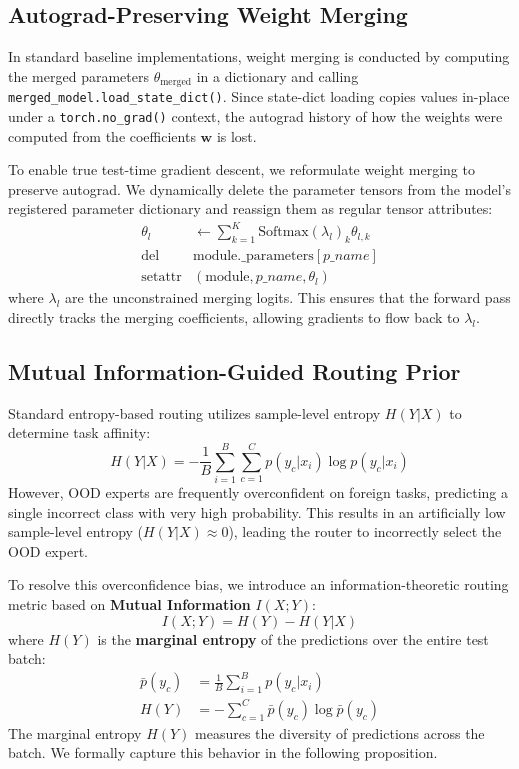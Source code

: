 \documentclass{article}
\theoremstyle{plain}
\theoremstyle{definition}
\theoremstyle{remark}
\begin{document}
\subsection{Autograd-Preserving Weight Merging}
In standard baseline implementations, weight merging is conducted by computing the merged parameters $\theta_{\text{merged}}$ in a dictionary and calling \texttt{merged\_model.load\_state\_dict()}. Since state-dict loading copies values in-place under a \texttt{torch.no\_grad()} context, the autograd history of how the weights were computed from the coefficients $\mathbf{w}$ is lost.

To enable true test-time gradient descent, we reformulate weight merging to preserve autograd. We dynamically delete the parameter tensors from the model's registered parameter dictionary and reassign them as regular tensor attributes:
\begin{align}
    \theta_{l} &\leftarrow \sum_{k=1}^K \text{Softmax}(\lambda_l)_k \theta_{l, k} \\
    \text{del }& \text{module.\_parameters}[p\_name] \\
    \text{setattr}&(\text{module}, p\_name, \theta_l)
\end{align}
where $\lambda_l$ are the unconstrained merging logits. This ensures that the forward pass directly tracks the merging coefficients, allowing gradients to flow back to $\lambda_l$.

\subsection{Mutual Information-Guided Routing Prior}
\label{sec:mi_routing}
Standard entropy-based routing utilizes sample-level entropy $H(Y|X)$ to determine task affinity:
\begin{equation}
    H(Y|X) = - \frac{1}{B} \sum_{i=1}^B \sum_{c=1}^C p(y_c | x_i) \log p(y_c | x_i)
\end{equation}
However, OOD experts are frequently overconfident on foreign tasks, predicting a single incorrect class with very high probability. This results in an artificially low sample-level entropy ($H(Y|X) \approx 0$), leading the router to incorrectly select the OOD expert.

To resolve this overconfidence bias, we introduce an information-theoretic routing metric based on \textbf{Mutual Information} $I(X; Y)$:
\begin{equation}
    I(X; Y) = H(Y) - H(Y|X)
\end{equation}
where $H(Y)$ is the \textbf{marginal entropy} of the predictions over the entire test batch:
\begin{align}
    \bar{p}(y_c) &= \frac{1}{B} \sum_{i=1}^B p(y_c | x_i) \\
    H(Y) &= - \sum_{c=1}^C \bar{p}(y_c) \log \bar{p}(y_c)
\end{align}
The marginal entropy $H(Y)$ measures the diversity of predictions across the batch. We formally capture this behavior in the following proposition.
\end{document}
